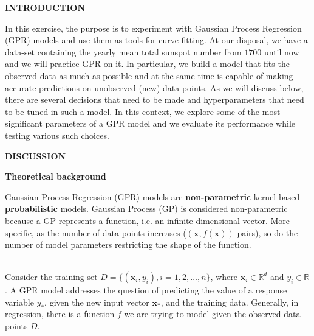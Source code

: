 \documentclass[12pt,a4paper]{article}
\newcommand{\boldmark}[1]{\noindent\textbf{#1}\\ }
\begin{document}
\sectionmark{}
\noindent
\boldmark{\Large{{\color{crimsonglory}INTRODUCTION}}}

\normalsize

\noindent
In this exercise, the purpose is to experiment with Gaussian Process Regression (GPR) models and use them as tools for curve fitting. At our disposal, we have a data-set containing the yearly mean total sunspot number from $1700$ until now and we will practice GPR on it. In particular, we build a model that fits the observed data as much as possible and at the same time is capable of making accurate predictions on unobserved (new) data-points. As we will discuss below, there are several decisions that need to be made and hyperparameters that need to be tuned in such a model. In this context, we explore some of the most significant parameters of a GPR model and we evaluate its performance while testing various such choices.

\vspace{1.5cm}

\sectionmark{}
\noindent
\boldmark{\Large{{\color{crimsonglory}DISCUSSION}}}

\vspace{0.5cm}

\subsectionmark{}
\noindent
\boldmark{\large{Theoretical background}}

\normalsize

\noindent
Gaussian Process Regression (GPR) models are \textbf{non-parametric} kernel-based \textbf{probabilistic} models. Gaussian Process (GP) is considered non-parametric because a GP represents a function, i.e. an infinite dimensional vector. More specific, as the number of data-points increases ($(\mathbf{x}, f(\mathbf{x}))$ pairs), so do the number of model parameters restricting the shape of the function.

\noindent
\\Consider the training set $D = \{(\mathbf{x}_i,y_i), i = 1,2,\dots,n\}$, where $\mathbf{x}_i \in \mathbb{R}^{d}$ and $y_i \in \mathbb{R}$. A GPR model addresses the question of predicting the value of a response variable $y_{*}$, given the new input vector $\mathbf{x}_{*}$, and the training data. Generally, in regression, there is a function $f$ we are trying to model given the observed data points $D$.
\end{document}
